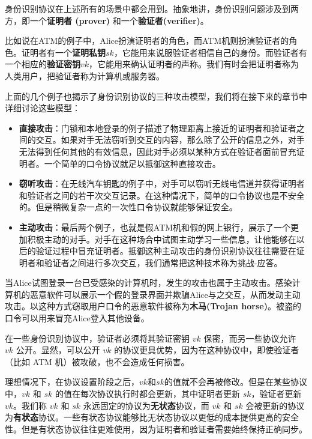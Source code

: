 \begin{snote}
身份识别协议在上述所有的场景中都会用到。抽象地讲，身份识别问题涉及到两方，即一个\textbf{证明者 (prover)} 和一个\textbf{验证者(verifier)}。

比如说在ATM的例子中，Alice扮演证明者的角色，而ATM机则扮演验证者的角色。证明者有一个\textbf{证明私钥}$sk$，它能用来说服验证者相信自己的身份。而验证者有一个相应的\textbf{验证密钥}$vk$，它能用来确认证明者的声称。我们有时会把证明者称为人类用户，把验证者称为计算机或服务器。

上面的几个例子也揭示了身份识别协议的三种攻击模型，我们将在接下来的章节中详细讨论这些模型：

\begin{itemize}
    \item \textbf{直接攻击}：门锁和本地登录的例子描述了物理距离上接近的证明者和验证者之间的交互。如果对手无法窃听到交互的内容，那么除了公开的信息之外，对手无法得到任何其他的有效信息，因此对手必须以某种方式在验证者面前冒充证明者。一个简单的口令协议就足以抵御这种直接攻击。
    \item \textbf{窃听攻击}：在无线汽车钥匙的例子中，对手可以窃听无线电信道并获得证明者和验证者之间的若干次交互记录。在这种情况下，简单的口令协议也是不安全的。但是稍微复杂一点的一次性口令协议就能够保证安全。
    \item \textbf{主动攻击}：最后两个例子，也就是假ATM机和假的网上银行，展示了一个更加积极主动的对手。对手在这种场合中试图主动学习一些信息，让他能够在以后的验证过程中冒充证明者。抵御这种主动攻击的身份识别协议往往需要在证明者和验证者之间进行多次交互，我们通常把这种技术称为挑战-应答。
\end{itemize}

当Alice试图登录一台已受感染的计算机时，发生的攻击也属于主动攻击。感染计算机的恶意软件可以展示一个假的登录界面并欺骗Alice与之交互，从而发动主动攻击。以这种方式窃取用户口令的恶意软件被称为\textbf{木马(Trojan horse)}。被盗的口令可以用来冒充Alice登入其他设备。	
\end{snote}

\begin{snote}[验证密钥的保密与公开.]
在一些身份识别协议中，验证者必须将其验证密钥 $vk$ 保密，而另一些协议允许 $vk$ 公开。显然，可以公开 $vk$ 的协议更具优势，因为在这种协议中，即使验证者（比如 ATM 机）被攻破，也不会造成任何损害。
\end{snote}

\begin{snote}[无状态协议与有状态协议.]
理想情况下，在协议设置阶段之后，$vk$和$sk$的值就不会再被修改。但是在某些协议中，$vk$ 和 $sk$ 的值在每次协议执行时都会更新，其中证明者更新 $sk$，验证者更新 $vk$。我们称 $vk$ 和 $sk$ 永远固定的协议为\textbf{无状态}协议，而 $vk$ 和 $sk$ 会被更新的协议为\textbf{有状态}协议。一些有状态协议能够比无状态协议以更低的成本提供更高的安全性。但是有状态协议往往更难使用，因为证明者和验证者需要始终保持正确同步。
\end{snote}

